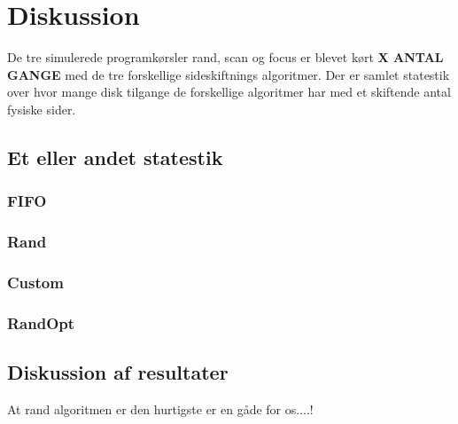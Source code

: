 \section{Diskussion}
De tre simulerede programkørsler rand, scan og focus er blevet kørt \textbf{X ANTAL GANGE} med de tre forskellige sideskiftnings algoritmer. Der er samlet statestik over hvor mange disk tilgange de forskellige algoritmer har med et skiftende antal fysiske sider.

\subsection{Et eller andet statestik}

\subsubsection{FIFO}

\subsubsection{Rand}

\subsubsection{Custom}

\subsubsection{RandOpt}

\subsection{Diskussion af resultater}
At rand algoritmen er den hurtigste er en gåde for os....!
